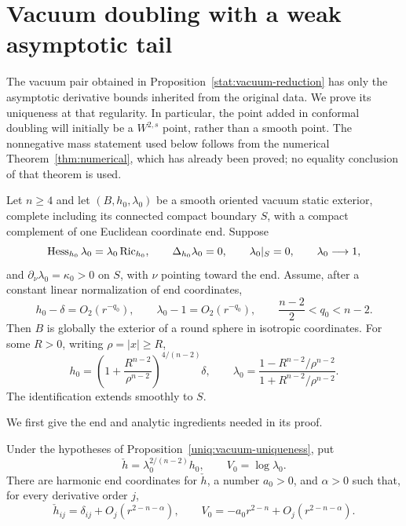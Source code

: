 \section{Vacuum doubling with a weak asymptotic tail}
\label{uniq:section}

The vacuum pair obtained in Proposition~\ref{stat:vacuum-reduction}
has only the asymptotic derivative bounds inherited from the original
data. We prove its uniqueness at that regularity. In particular, the
point added in conformal doubling will initially be a
$W^{2,s}$ point, rather than a smooth point. The nonnegative mass
statement used below follows from the numerical
Theorem~\ref{thm:numerical}, which has already been proved; no equality
conclusion of that theorem is used.

\begin{proposition}\label{uniq:vacuum-uniqueness}
Let $n\geq4$ and let $(B,h_0,\lambda_0)$ be a smooth oriented vacuum static
exterior, complete including its connected compact boundary $S$,
with a compact complement of one Euclidean coordinate end. Suppose
\begin{equation}\label{uniq:static-equations}
 \operatorname{Hess}_{h_0}\lambda_0=\lambda_0\operatorname{Ric}_{h_0},\qquad
 \Delta_{h_0}\lambda_0=0,\qquad
 \lambda_0|_S=0,\qquad \lambda_0\longrightarrow1,
\end{equation}
and $\partial_\nu\lambda_0=\kappa_0>0$ on $S$, with $\nu$ pointing
toward the end. Assume, after a constant linear normalization of end
coordinates,
\begin{equation}\label{uniq:initial-tail}
 h_0-\delta=O_2(r^{-q_0}),\qquad
 \lambda_0-1=O_2(r^{-q_0}),\qquad
 \frac{n-2}{2}<q_0<n-2.
\end{equation}
Then $B$ is globally the exterior of a round sphere in isotropic
coordinates. For some $R>0$, writing $\rho=|x|\geq R$,
\begin{equation}\label{uniq:schwarzschild-pair}
 h_0=\left(1+\frac{R^{n-2}}{\rho^{n-2}}\right)^{4/(n-2)}\delta,
 \qquad
 \lambda_0=
 \frac{1-R^{n-2}/\rho^{n-2}}{1+R^{n-2}/\rho^{n-2}}.
\end{equation}
The identification extends smoothly to $S$.
\end{proposition}

We first give the end and analytic ingredients needed in its proof.

\begin{lemma}
\label{uniq:end-expansion}
Under the hypotheses of Proposition~\ref{uniq:vacuum-uniqueness}, put
\[
 \check h=\lambda_0^{2/(n-2)}h_0,
 \qquad V_0=\log\lambda_0.
\]
There are harmonic end coordinates for $\check h$, a number $a_0>0$,
and $\alpha>0$ such that, for every derivative order $j$,
\begin{equation}\label{uniq:improved-tail}
 \check h_{ij}=\delta_{ij}+O_j(r^{2-n-\alpha}),\qquad
 V_0=-a_0r^{2-n}+O_j(r^{2-n-\alpha}).
\end{equation}
\end{lemma}

